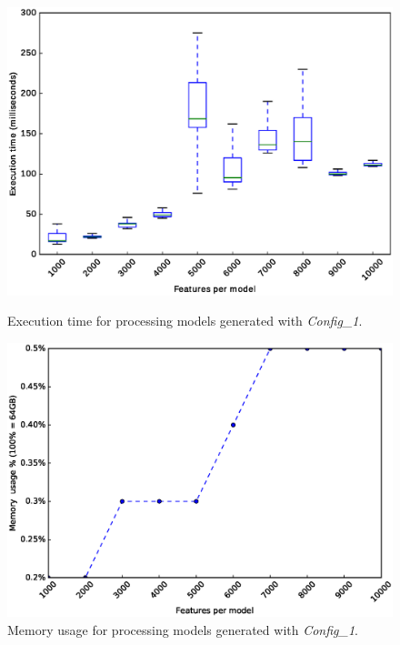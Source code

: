 \begin{figure}[h]
	\centering
	\begin{minipage}[b]{0.48\textwidth}
		\includegraphics[width=\textwidth]{boxplot_0_1.eps}
		\caption{Execution time for processing models generated with \textit{Config\_1}.}\label{fig:plot:probs:boxplot_0_1}
	\end{minipage}
	\hfill
	\begin{minipage}[b]{0.48\textwidth}
		\includegraphics[width=\textwidth]{boxplot_0_1_mem.eps}
		\caption{Memory usage for processing models generated with \textit{Config\_1}.}\label{fig:plot:probs:boxplot_0_1_mem}
	\end{minipage}
\end{figure}

